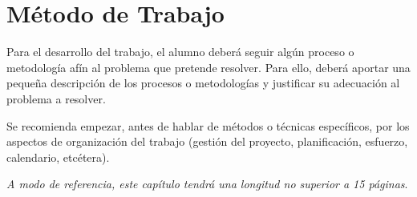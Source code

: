 \chapter{Método de Trabajo}
\label{chap:metodo}

\noindent
Para el desarrollo del trabajo, el alumno deberá seguir algún proceso o
metodología afín al problema que pretende resolver. Para ello, deberá aportar
una pequeña descripción de los procesos o metodologías y justificar su
adecuación al problema a resolver.

Se recomienda empezar, antes de hablar de métodos o técnicas específicos, por
los aspectos de organización del trabajo (gestión del proyecto, planificación,
esfuerzo, calendario, etcétera).

\emph{A modo de referencia, este capítulo tendrá una longitud no superior a 15
  páginas}.
